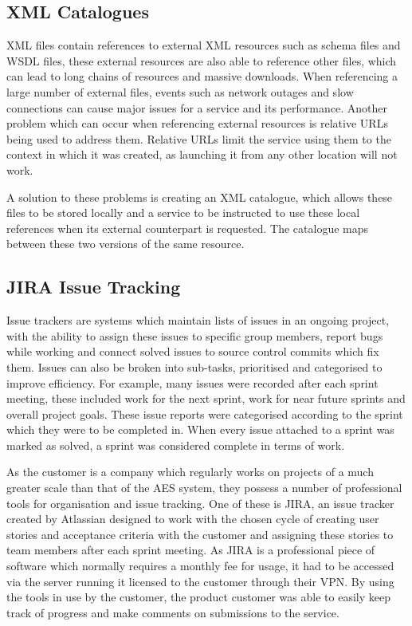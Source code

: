 \documentclass[a4paper, 12pt, twoside]{article}
\begin{document}
\subsection{XML Catalogues}
\label{sec:bg_catalogues}

XML files contain references to external XML resources such as schema files and WSDL files, these external resources are also able to reference other files, which can lead to long chains of resources and massive downloads. When referencing a large number of external files, events such as network outages and slow connections can cause major issues for a service and its performance. Another problem which can occur when referencing external resources is relative URLs being used to address them. Relative URLs limit the service using them to the context in which it was created, as launching it from any other location will not work.

A solution to these problems is creating an XML catalogue, which allows these files to be stored locally and a service to be instructed to use these local references when its external counterpart is requested. The catalogue maps between these two versions of the same resource.

\subsection{JIRA Issue Tracking}
\label{sec:bg_jira}

Issue trackers are systems which maintain lists of issues in an ongoing project, with the ability to assign these issues to specific group members, report bugs while working and connect solved issues to source control commits which fix them. Issues can also be broken into sub-tasks, prioritised and categorised to improve efficiency. For example, many issues were recorded after each sprint meeting, these included work for the next sprint, work for near future sprints and overall project goals. These issue reports were categorised according to the sprint which they were to be completed in. When every issue attached to a sprint was marked as solved, a sprint was considered complete in terms of work.

As the customer is a company which regularly works on projects of a much greater scale than that of the AES system, they possess a number of professional tools for organisation and issue tracking. One of these is JIRA, an issue tracker created by Atlassian designed to work with the chosen cycle of creating user stories and acceptance criteria with the customer and assigning these stories to team members after each sprint meeting. As JIRA is a professional piece of software which normally requires a monthly fee for usage, it had to be accessed via the server running it licensed to the customer through their VPN. By using the tools in use by the customer, the product customer was able to easily keep track of progress and make comments on submissions to the service.
\end{document}
